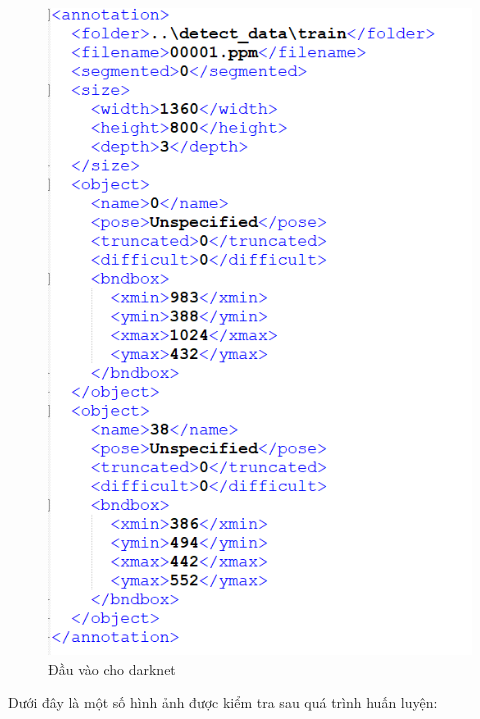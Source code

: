 \begin{figure}[H]
\begin{center}
\includegraphics[scale=0.8]{chap5/image/annotation.png}
\end{center}
\caption{Đầu vào cho darknet}
\end{figure}
Dưới đây là một số hình ảnh được kiểm tra sau quá trình huấn luyện:
